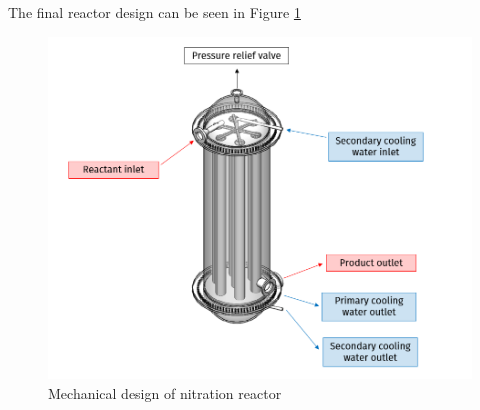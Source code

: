 The final reactor design can be seen in Figure \ref{fig:executivesummaryreactor}
\begin{figure}[h]
    \centering
    \includegraphics[width=0.7\linewidth]{chapters/0-executive-summary/figures/FYD executive sum.PNG}
    \caption{Mechanical design of nitration reactor}
    \label{fig:executivesummaryreactor}
\end{figure}